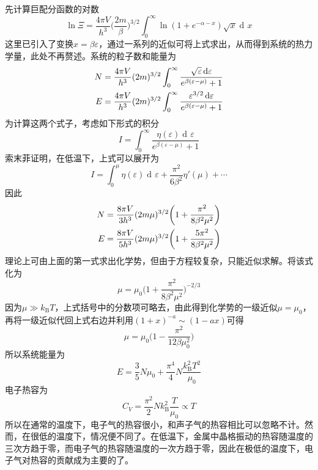 \documentclass[UTF8,oneside,openany]{ctexbook}
\DeclareMathOperator\dif{d\!}
\newcommand\kb{k_{\text{B}}}
\begin{document}
\\
\\
先计算巨配分函数的对数
\begin{equation}
\ln\Xi=\frac{4\pi V}{h^3}\biggl(\frac{2m}{\beta}\biggr)^{3/2}\int_{0}^{\infty}\ln(1+e^{-\alpha-x})\sqrt{x}\dif x
\end{equation}
这里已引入了变换$x=\beta\varepsilon$，通过一系列的近似可将上式求出，从而得到系统的热力学量，此处不再赘述。系统的粒子数和能量为
\begin{align}
N&=\frac{4\pi V}{h^3}(2m)^{3/2}\int_{0}^{\infty}\frac{\sqrt{\varepsilon}\dif\varepsilon}{e^{\beta(\varepsilon-\mu)}+1}\notag\\
E&=\frac{4\pi V}{h^3}(2m)^{3/2}\int_{0}^{\infty}\frac{\varepsilon^{3/2}\dif\varepsilon}{e^{\beta(\varepsilon-\mu)}+1}
\end{align}
为计算这两个式子，考虑如下形式的积分
\begin{equation}
I=\int_{0}^{\infty}\frac{\eta(\varepsilon)\dif\varepsilon}{e^{\beta(\varepsilon-\mu)}+1}
\end{equation}
索末菲证明，在低温下，上式可以展开为
\begin{equation}
I=\int_{0}^{\mu}\eta(\varepsilon)\dif\varepsilon+\frac{\pi^2}{6\beta^2}\eta'(\mu)+\cdots
\end{equation}
因此
\begin{align}
N&=\frac{8\pi V}{3h^3}(2m\mu)^{3/2}\biggl(1+\frac{\pi^2}{8\beta^2\mu^2}\biggr)\notag\\
E&=\frac{8\pi V}{5h^3}(2m\mu)^{3/2}\biggl(1+\frac{5\pi^2}{8\beta^2\mu^2}\biggr)
\end{align}
理论上可由上面的第一式求出化学势，但由于方程较复杂，只能近似求解。将该式化为
\begin{equation}
\mu=\mu_0\biggl(1+\frac{\pi^2}{8\beta^2\mu^2}\biggr)^{-2/3}
\end{equation}
因为$\mu\gg\kb T$，上式括号中的分数项可略去，由此得到化学势的一级近似$\mu=\mu_0$，再将一级近似代回上式右边并利用$(1+x)^{-a}\sim(1-ax)$可得
\begin{equation}
\mu=\mu_0\biggl(1-\frac{\pi^2}{12\beta\mu_0^2}\biggr)
\end{equation}
所以系统能量为
\begin{equation}
E=\frac35N\mu_0+\frac{\pi^4}{4}N\frac{\kb^2T^2}{\mu_0}
\end{equation}
电子热容为
\begin{equation}
C_V=\frac{\pi^2}{2}N\kb^2\frac{T}{\mu_0}\propto T
\end{equation}
所以在通常的温度下，电子气的热容很小，和声子气的热容相比可以忽略不计。然而，在很低的温度下，情况便不同了。在低温下，金属中晶格振动的热容随温度的三次方趋于零，而电子气的热容随温度的一次方趋于零，因此在极低的温度下，电子气对热容的贡献成为主要的了。
\appendix
\end{document}

